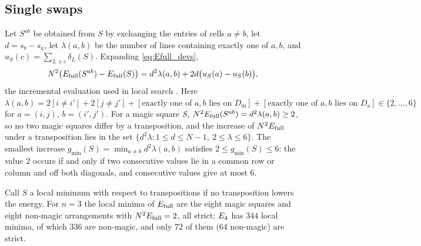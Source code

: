 \subsection{Single swaps}
\label{sec:swap-gaps}

\begin{remark}
\label{rem:swap}
Let $S^{ab}$ be obtained from $S$ by exchanging the entries of cells $a\ne b$, let $d=s_b-s_a$, let $\lambda(a,b)$ be the number of lines containing exactly one of $a,b$, and $u_S(c)=\sum_{L\ni c}\delta_L(S)$.
Expanding \eqref{eq:Efull_devs},
\[
N^{2}\bigl(E_{\mathrm{full}}(S^{ab})-E_{\mathrm{full}}(S)\bigr)=d^{2}\lambda(a,b)+2d\bigl(u_S(a)-u_S(b)\bigr),
\]
the incremental evaluation used in local search \cite{pinn1998number}.
Here $\lambda(a,b)=2[i\ne i']+2[j\ne j']+[\text{exactly one of }a,b\text{ lies on }D_{\mathrm m}]+[\text{exactly one of }a,b\text{ lies on }D_{\mathrm a}]\in\{2,\dots,6\}$ for $a=(i,j)$, $b=(i',j')$.
For a magic square $S$, $N^2E_{\mathrm{full}}(S^{ab})=d^2\lambda(a,b)\ge2$, so no two magic squares differ by a transposition, and the increase of $N^2E_{\mathrm{full}}$ under a transposition lies in the set $\{d^2\lambda:1\le d\le N-1,\ 2\le\lambda\le6\}$.
The smallest increase $g_{\min}(S)=\min_{a\ne b}d^2\lambda(a,b)$ satisfies $2\le g_{\min}(S)\le6$: the value $2$ occurs if and only if two consecutive values lie in a common row or column and off both diagonals, and consecutive values give at most $6$.
\end{remark}

Call $S$ a local minimum with respect to transpositions if no transposition lowers the energy.
For $n=3$ the local minima of $E_{\mathrm{full}}$ are the eight magic squares and eight non-magic arrangements with $N^2E_{\mathrm{full}}=2$, all strict; $E_4$ has $344$ local minima, of which $336$ are non-magic, and only $72$ of them ($64$ non-magic) are strict.
